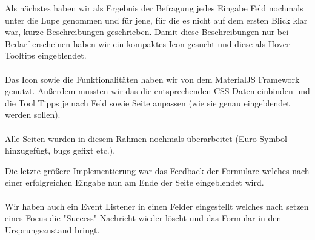 \documentclass[runningheads,a4paper]{llncs}
\begin{document}
Als nächstes haben wir als Ergebnis der Befragung jedes Eingabe Feld nochmals unter die Lupe genommen und für jene, für die es nicht auf dem ersten Blick klar war, kurze Beschreibungen geschrieben. Damit diese Beschreibungen nur bei Bedarf erscheinen haben wir ein kompaktes Icon gesucht und diese als Hover Tooltips eingeblendet.  \\\\ Das Icon sowie die Funktionalitäten haben wir von dem MaterialJS Framework genutzt. Außerdem mussten wir das die entsprechenden CSS Daten einbinden und die Tool Tipps je nach Feld sowie Seite anpassen (wie sie genau eingeblendet werden sollen). \\\\Alle Seiten wurden in diesem Rahmen nochmals überarbeitet (Euro Symbol hinzugefügt, bugs gefixt etc.).

Die letzte größere Implementierung war das Feedback der Formulare welches nach einer erfolgreichen Eingabe nun am Ende der Seite eingeblendet wird. \\\\Wir haben auch ein Event Listener in einen Felder eingestellt welches nach setzen eines Focus die "Success" Nachricht wieder löscht und das Formular in den Ursprungszustand bringt. 
\end{document}
